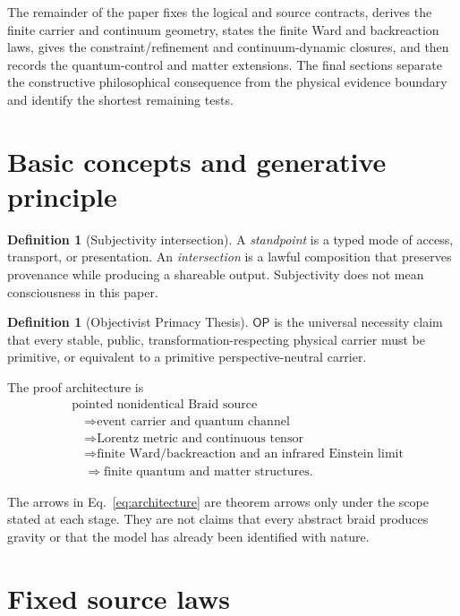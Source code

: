\documentclass[11pt]{article}
\theoremstyle{definition}
\newtheorem{definition}[theorem]{Definition}
\theoremstyle{remark}
\newcommand{\OPT}{\mathsf{OP}}
\begin{document}
The remainder of the paper fixes the logical and source contracts, derives the
finite carrier and continuum geometry, states the finite Ward and
backreaction laws, gives the constraint/refinement and continuum-dynamic
closures, and then records the quantum-control and matter extensions. The
final sections separate the constructive philosophical consequence from the
physical evidence boundary and identify the shortest remaining tests.

\section{Basic concepts and generative principle}

\begin{definition}[Subjectivity intersection]
A \emph{standpoint} is a typed mode of access, transport, or presentation. An \emph{intersection} is a lawful composition that preserves provenance while producing a shareable output. Subjectivity does not mean consciousness in this paper.
\end{definition}

\begin{definition}[Objectivist Primacy Thesis]
$\OPT$ is the universal necessity claim that every stable, public, transformation-respecting physical carrier must be primitive, or equivalent to a primitive perspective-neutral carrier.
\end{definition}

The proof architecture is
\begin{equation}
\begin{aligned}
&\text{pointed nonidentical Braid source}\\
&\quad\Longrightarrow\text{event carrier and quantum channel}\\
&\quad\Longrightarrow\text{Lorentz metric and continuous tensor}\\
&\quad\Longrightarrow\text{finite Ward/backreaction and an infrared Einstein limit}\\
&\quad\Longrightarrow\text{finite quantum and matter structures}.
\end{aligned}
\label{eq:architecture}
\end{equation}

The arrows in Eq.~\eqref{eq:architecture} are theorem arrows only under the scope stated at each stage. They are not claims that every abstract braid produces gravity or that the model has already been identified with nature.

\section{Fixed source laws}
\end{document}
